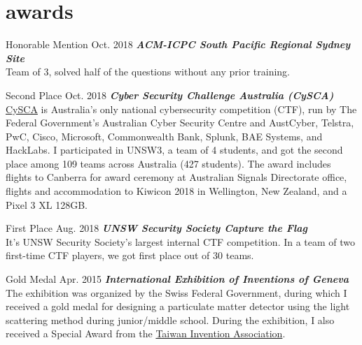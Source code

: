 \documentclass[hidelinks__VERSION__]{adamyi-cv}
\begin{document}
\section{awards}

\begin{entrylist}


\entry
{Honorable Mention}
{Oct. 2018}
{\emph{\textbf{ACM-ICPC South Pacific Regional Sydney Site}}\\
Team of 3, solved half of the questions without any prior training.
}


\entry
{Second Place}
{Oct. 2018}
{\emph{\textbf{Cyber Security Challenge Australia (CySCA)}}\\
\href{https://www.cyberchallenge.com.au/}{CySCA} is Australia’s only national cybersecurity competition (CTF), run by The Federal Government’s Australian Cyber Security Centre and AustCyber, Telstra, PwC, Cisco, Microsoft, Commonwealth Bank, Splunk, BAE Systems, and HackLabs. I participated in UNSW3, a team of 4 students, and got the second place among 109 teams across Australia (427 students). The award includes flights to Canberra for award ceremony at Australian Signals Directorate office, flights and accommodation to Kiwicon 2018 in Wellington, New Zealand, and a Pixel 3 XL 128GB.
}


\entry
{First Place}
{Aug. 2018}
{\emph{\textbf{UNSW Security Society Capture the Flag}}\\
It's UNSW Security Society's largest internal CTF competition. In a team of two first-time CTF players, we got first place out of 30 teams.
}


\entry
{Gold Medal}
{Apr. 2015}
{\emph{\textbf{International Exhibition of Inventions of Geneva}}\\
The exhibition was organized by the Swiss Federal Government, during which I received a gold medal for designing a particulate matter detector using the light scattering method during junior/middle school. During the exhibition, I also received a Special Award from the \href{http://www.tia-tw.net/}{Taiwan Invention Association}.
}


\end{entrylist}
\end{document}
